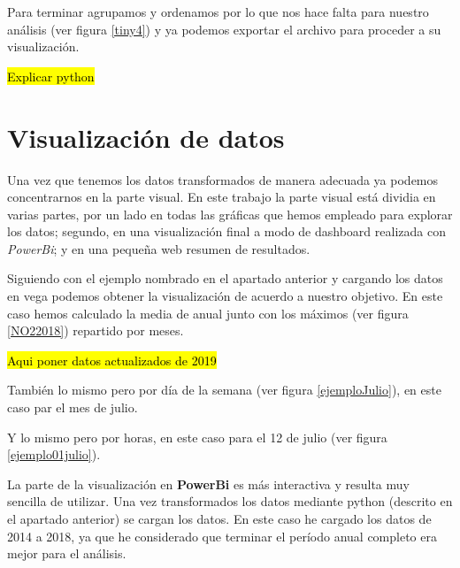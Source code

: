 
Para terminar agrupamos y ordenamos por lo que nos hace falta para nuestro análisis (ver figura \ref{tiny4}) y ya podemos exportar el archivo para proceder a su visualización.


 \hl{Explicar python}

\section{Visualización de datos}
Una vez que tenemos los datos transformados de manera adecuada ya podemos concentrarnos en la parte visual. En este trabajo la parte visual está dividia en varias partes, por un lado en todas las gráficas que hemos empleado para explorar los datos; segundo, en una visualización final a modo de dashboard realizada con \textit{PowerBi};  y en una pequeña web resumen de resultados.


Siguiendo con el ejemplo nombrado en el apartado anterior y cargando los datos en vega podemos obtener la visualización de acuerdo a nuestro objetivo. En este caso hemos calculado la media de  anual junto con los máximos (ver figura \ref{NO22018}) repartido por meses.

 \hl{Aqui poner datos actualizados de 2019}
 
También lo mismo pero por día de la semana (ver figura \ref{ejemploJulio}), en este caso par el mes de julio.



Y lo mismo pero por horas, en este caso para el 12 de julio (ver figura \ref{ejemplo01julio}).

La parte de la visualización en \textbf{PowerBi} es más interactiva y resulta muy sencilla de utilizar.  Una vez transformados los datos mediante python (descrito en el apartado anterior) se cargan los datos. En este caso he cargado los datos de 2014 a 2018, ya que he considerado que terminar el período anual completo era mejor para el análisis. 

